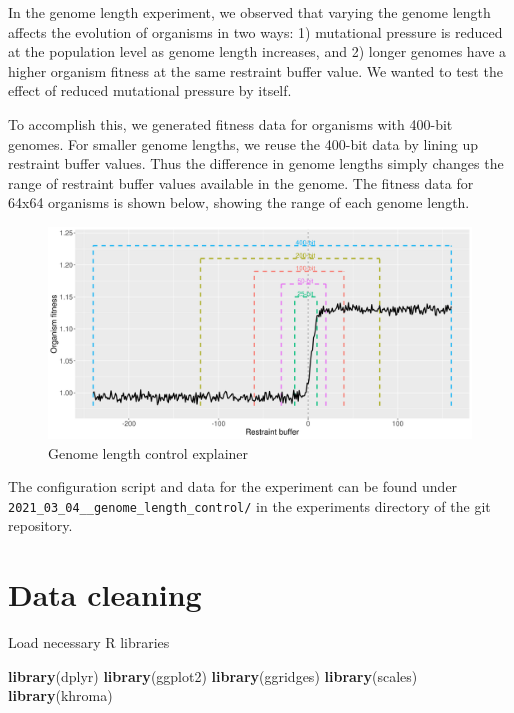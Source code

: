 \documentclass[]{book}
\newenvironment{Shaded}{\begin{snugshade}}{\end{snugshade}}
\newcommand{\KeywordTok}[1]{\textcolor[rgb]{0.13,0.29,0.53}{\textbf{#1}}}
\newcommand{\NormalTok}[1]{#1}
\begin{document}
In the genome length experiment, we observed that varying the genome length affects the evolution of organisms in two ways:
1) mutational pressure is reduced at the population level as genome length increases, and
2) longer genomes have a higher organism fitness at the same restraint buffer value.
We wanted to test the effect of reduced mutational pressure by itself.

To accomplish this, we generated fitness data for organisms with 400-bit genomes.
For smaller genome lengths, we reuse the 400-bit data by lining up restraint buffer values.
Thus the difference in genome lengths simply changes the range of restraint buffer values available in the genome.
The fitness data for 64x64 organisms is shown below, showing the range of each genome length.

\begin{figure}
\centering
\includegraphics{./genome_length_control/timing_control_explanation.png}
\caption{Genome length control explainer}
\end{figure}

The configuration script and data for the experiment can be found under \texttt{2021\_03\_04\_\_genome\_length\_control/} in the experiments directory of the git repository.

\hypertarget{data-cleaning-5}{%
\section{Data cleaning}\label{data-cleaning-5}}

Load necessary R libraries

\begin{Shaded}
\begin{Highlighting}[]
\KeywordTok{library}\NormalTok{(dplyr)}
\KeywordTok{library}\NormalTok{(ggplot2)}
\KeywordTok{library}\NormalTok{(ggridges)}
\KeywordTok{library}\NormalTok{(scales)}
\KeywordTok{library}\NormalTok{(khroma)}
\end{Highlighting}
\end{Shaded}
\end{document}
